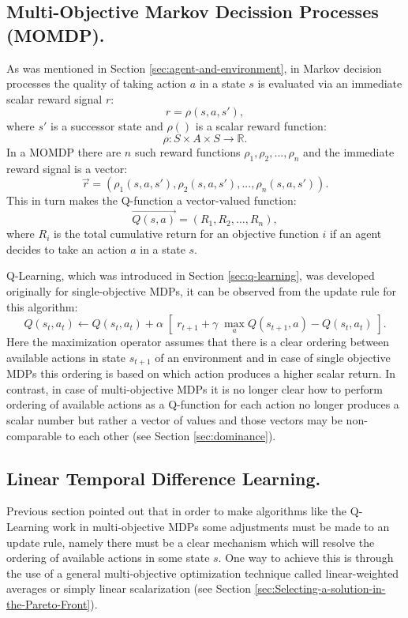 \subsection{Multi-Objective Markov Decission Processes (MOMDP).}
As was mentioned in Section \ref{sec:agent-and-environment}, in Markov decision processes the quality of taking action $a$ in a state $s$ is evaluated via an immediate scalar reward signal $r$:
$$ r = \rho(s,a,s'), $$
where $s'$ is a successor state and $\rho()$ is a scalar reward function:
$$ \rho : S \times A \times  S \rightarrow \mathbb{R}. $$
In a MOMDP there are $n$ such reward functions $\rho_{1},\rho_{2},...,\rho_{n}$ and the immediate reward signal is a vector:
$$ \vec{r} = (\rho_{1}(s,a,s'),\rho_{2}(s,a,s'),...,\rho_{n}(s,a,s')). $$
This in turn makes the Q-function a vector-valued function:
$$ \overrightarrow{Q(s,a)} = (R_{1},R_{2},...,R_{n}), $$
where $R_{i}$ is the total cumulative return for an objective function $i$ if an agent decides to take an action $a$ in a state $s$.

Q-Learning, which was introduced in Section \ref{sec:q-learning}, was developed originally for single-objective MDPs, it can be observed from the update rule for this algorithm:
$$ Q(s_{t},a_{t}) \leftarrow Q(s_{t},a_{t}) + \alpha \; \left[\;r_{t+1} + \gamma\; \max_{a}Q(s_{t+1},a) - Q(s_{t},a_{t})\;\right]. $$
Here the maximization operator assumes that there is a clear ordering between available actions in state $s_{t+1}$ of an environment and in case of single objective MDPs this ordering is based on which action produces a higher scalar return. In contrast, in case of multi-objective MDPs it is no longer clear how to perform ordering of available actions as a Q-function for each action no longer produces a scalar number but rather a vector of values and those vectors may be non-comparable to each other (see Section \ref{sec:dominance}).

\subsection{Linear Temporal Difference Learning.}
Previous section pointed out that in order to make algorithms like the Q-Learning work in multi-objective MDPs some adjustments must be made to an update rule, namely there must be a clear mechanism which will resolve the ordering of available actions in some state $s$. One way to achieve this is through the use of a general multi-objective optimization technique called linear-weighted averages or simply linear scalarization (see Section \ref{sec:Selecting-a-solution-in-the-Pareto-Front}).

